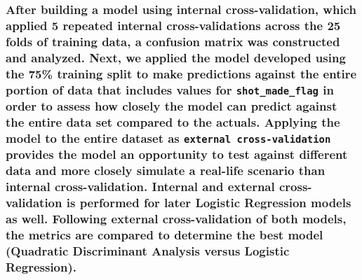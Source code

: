\documentclass[american,]{article}
\begin{document}
{\subsubsection{\texorpdfstring{After building a model using internal cross-validation, which applied 5 repeated internal cross-validations across the 25 folds of training data, a confusion matrix was constructed and analyzed. Next, we applied the model developed using the 75\% training split to make predictions against the entire portion of data that includes values for \texttt{shot\_made\_flag} in order to assess how closely the model can predict against the entire data set compared to the actuals. Applying the model to the entire dataset as \texttt{external\ cross-validation} provides the model an opportunity to test against different data and more closely simulate a real-life scenario than internal cross-validation. Internal and external cross-validation is performed for later Logistic Regression models as well. Following external cross-validation of both models, the metrics are compared to determine the best model (Quadratic Discriminant Analysis versus Logistic Regression).}{After building a model using internal cross-validation, which applied 5 repeated internal cross-validations across the 25 folds of training data, a confusion matrix was constructed and analyzed. Next, we applied the model developed using the 75\% training split to make predictions against the entire portion of data that includes values for shot\_made\_flag in order to assess how closely the model can predict against the entire data set compared to the actuals. Applying the model to the entire dataset as external cross-validation provides the model an opportunity to test against different data and more closely simulate a real-life scenario than internal cross-validation. Internal and external cross-validation is performed for later Logistic Regression models as well. Following external cross-validation of both models, the metrics are compared to determine the best model (Quadratic Discriminant Analysis versus Logistic Regression).}}\label{after-building-a-model-using-internal-cross-validation-which-applied-5-repeated-internal-cross-validations-across-the-25-folds-of-training-data-a-confusion-matrix-was-constructed-and-analyzed.-next-we-applied-the-model-developed-using-the-75-training-split-to-make-predictions-against-the-entire-portion-of-data-that-includes-values-for-shot_made_flag-in-order-to-assess-how-closely-the-model-can-predict-against-the-entire-data-set-compared-to-the-actuals.-applying-the-model-to-the-entire-dataset-as-external-cross-validation-provides-the-model-an-opportunity-to-test-against-different-data-and-more-closely-simulate-a-real-life-scenario-than-internal-cross-validation.-internal-and-external-cross-validation-is-performed-for-later-logistic-regression-models-as-well.-following-external-cross-validation-of-both-models-the-metrics-are-compared-to-determine-the-best-model-quadratic-discriminant-analysis-versus-logistic-regression.}}
\end{document}
